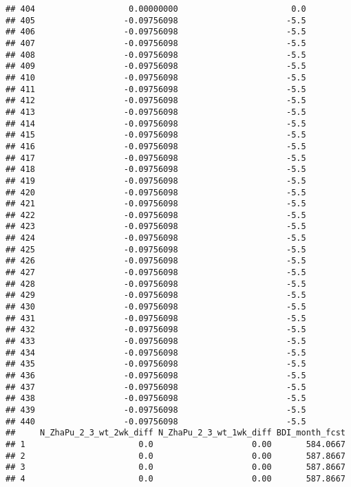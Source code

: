 \documentclass[]{article}
\begin{document}
\begin{verbatim}
## 404                   0.00000000                       0.0
## 405                  -0.09756098                      -5.5
## 406                  -0.09756098                      -5.5
## 407                  -0.09756098                      -5.5
## 408                  -0.09756098                      -5.5
## 409                  -0.09756098                      -5.5
## 410                  -0.09756098                      -5.5
## 411                  -0.09756098                      -5.5
## 412                  -0.09756098                      -5.5
## 413                  -0.09756098                      -5.5
## 414                  -0.09756098                      -5.5
## 415                  -0.09756098                      -5.5
## 416                  -0.09756098                      -5.5
## 417                  -0.09756098                      -5.5
## 418                  -0.09756098                      -5.5
## 419                  -0.09756098                      -5.5
## 420                  -0.09756098                      -5.5
## 421                  -0.09756098                      -5.5
## 422                  -0.09756098                      -5.5
## 423                  -0.09756098                      -5.5
## 424                  -0.09756098                      -5.5
## 425                  -0.09756098                      -5.5
## 426                  -0.09756098                      -5.5
## 427                  -0.09756098                      -5.5
## 428                  -0.09756098                      -5.5
## 429                  -0.09756098                      -5.5
## 430                  -0.09756098                      -5.5
## 431                  -0.09756098                      -5.5
## 432                  -0.09756098                      -5.5
## 433                  -0.09756098                      -5.5
## 434                  -0.09756098                      -5.5
## 435                  -0.09756098                      -5.5
## 436                  -0.09756098                      -5.5
## 437                  -0.09756098                      -5.5
## 438                  -0.09756098                      -5.5
## 439                  -0.09756098                      -5.5
## 440                  -0.09756098                      -5.5
##     N_ZhaPu_2_3_wt_2wk_diff N_ZhaPu_2_3_wt_1wk_diff BDI_month_fcst
## 1                       0.0                    0.00       584.0667
## 2                       0.0                    0.00       587.8667
## 3                       0.0                    0.00       587.8667
## 4                       0.0                    0.00       587.8667

\end{verbatim}
\end{document}

